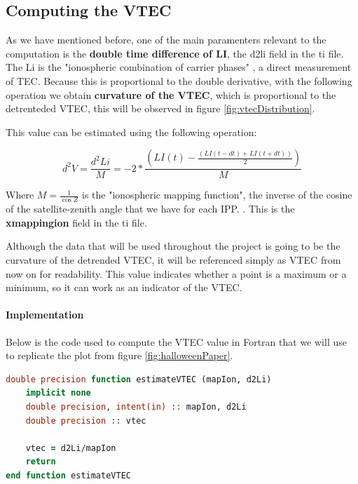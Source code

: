 \subsection{Computing the VTEC}

As we have mentioned before, one of the main paramenters relevant to the computation is the \textbf{double time difference of LI}, the d2li field in the ti file. The Li is the "ionospheric combination of carrier phases" \cite{hernandez2012gnss}, a direct measurement of TEC. Because this is proportional to the double derivative, with the following operation we obtain \textbf{curvature of the VTEC}, which is proportional to the detrenteded VTEC, this will be observed in figure \ref{fig:vtecDistribution}.

This value can be estimated using the following operation:

\begin{equation} \label{eq:1}
	d^{2}V = \frac{d^{2}Li}{M} = -2 * \frac{(LI(t) - \frac{(LI(t-dt)+ LI(t+dt))}{2})}{M}
\end{equation}

Where $M=\frac{1}{\cos Z}$ is the "ionospheric mapping function", the inverse of the cosine of the satellite-zenith angle that we have for each IPP. \cite{hernandez2012gnss}. This is the \textbf{xmappingion} field in the ti file.

Although the data that will be used throughout the project is going to be the curvature of the detrended VTEC, it will be referenced simply as VTEC from now on for readability. This value indicates whether a point is a maximum or a minimum, so it can work as an indicator of the VTEC.

\paragraph{Implementation}

Below is the code used to compute the VTEC value in Fortran that we will use to replicate the plot from figure \ref{fig:halloweenPaper}.

\begin{minipage}{\linewidth}
\begin{lstlisting}[language=Fortran, caption=Simple Fortran function to compute the VTEC value]
double precision function estimateVTEC (mapIon, d2Li)
	implicit none
	double precision, intent(in) :: mapIon, d2Li
	double precision :: vtec
	
	vtec = d2Li/mapIon
	return
end function estimateVTEC
\end{lstlisting}
\end{minipage}

